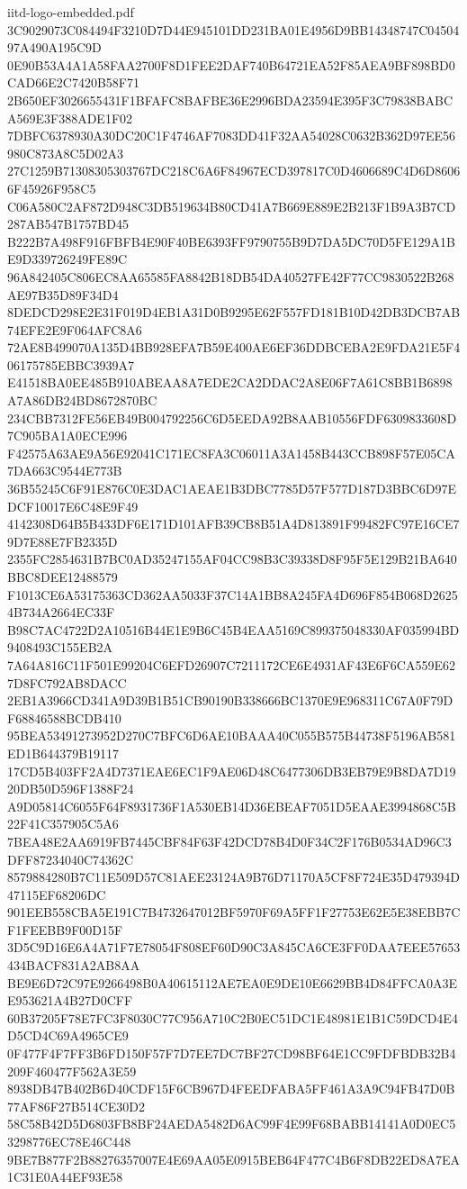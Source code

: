 \begin{filecontents*}[overwrite]{iitd-logo-embedded.pdf}
3C9029073C084494F3210D7D44E945101DD231BA01E4956D9BB14348747C0450497A490A195C9D
0E90B53A4A1A58FAA2700F8D1FEE2DAF740B64721EA52F85AEA9BF898BD0CAD66E2C7420B58F71
2B650EF3026655431F1BFAFC8BAFBE36E2996BDA23594E395F3C79838BABCA569E3F388ADE1F02
7DBFC6378930A30DC20C1F4746AF7083DD41F32AA54028C0632B362D97EE56980C873A8C5D02A3
27C1259B71308305303767DC218C6A6F84967ECD397817C0D4606689C4D6D86066F45926F958C5
C06A580C2AF872D948C3DB519634B80CD41A7B669E889E2B213F1B9A3B7CD287AB547B1757BD45
B222B7A498F916FBFB4E90F40BE6393FF9790755B9D7DA5DC70D5FE129A1BE9D339726249FE89C
96A842405C806EC8AA65585FA8842B18DB54DA40527FE42F77CC9830522B268AE97B35D89F34D4
8DEDCD298E2E31F019D4EB1A31D0B9295E62F557FD181B10D42DB3DCB7AB74EFE2E9F064AFC8A6
72AE8B499070A135D4BB928EFA7B59E400AE6EF36DDBCEBA2E9FDA21E5F406175785EBBC3939A7
E41518BA0EE485B910ABEAA8A7EDE2CA2DDAC2A8E06F7A61C8BB1B6898A7A86DB24BD8672870BC
234CBB7312FE56EB49B004792256C6D5EEDA92B8AAB10556FDF6309833608D7C905BA1A0ECE996
F42575A63AE9A56E92041C171EC8FA3C06011A3A1458B443CCB898F57E05CA7DA663C9544E773B
36B55245C6F91E876C0E3DAC1AEAE1B3DBC7785D57F577D187D3BBC6D97EDCF10017E6C48E9F49
4142308D64B5B433DF6E171D101AFB39CB8B51A4D813891F99482FC97E16CE79D7E88E7FB2335D
2355FC2854631B7BC0AD35247155AF04CC98B3C39338D8F95F5E129B21BA640BBC8DEE12488579
F1013CE6A53175363CD362AA5033F37C14A1BB8A245FA4D696F854B068D26254B734A2664EC33F
B98C7AC4722D2A10516B44E1E9B6C45B4EAA5169C899375048330AF035994BD9408493C155EB2A
7A64A816C11F501E99204C6EFD26907C7211172CE6E4931AF43E6F6CA559E627D8FC792AB8DACC
2EB1A3966CD341A9D39B1B51CB90190B338666BC1370E9E968311C67A0F79DF68846588BCDB410
95BEA53491273952D270C7BFC6D6AE10BAAA40C055B575B44738F5196AB581ED1B644379B19117
17CD5B403FF2A4D7371EAE6EC1F9AE06D48C6477306DB3EB79E9B8DA7D1920DB50D596F1388F24
A9D05814C6055F64F8931736F1A530EB14D36EBEAF7051D5EAAE3994868C5B22F41C357905C5A6
7BEA48E2AA6919FB7445CBF84F63F42DCD78B4D0F34C2F176B0534AD96C3DFF87234040C74362C
8579884280B7C11E509D57C81AEE23124A9B76D71170A5CF8F724E35D479394D47115EF68206DC
901EEB558CBA5E191C7B4732647012BF5970F69A5FF1F27753E62E5E38EBB7CF1FEEBB9F00D15F
3D5C9D16E6A4A71F7E78054F808EF60D90C3A845CA6CE3FF0DAA7EEE57653434BACF831A2AB8AA
BE9E6D72C97E9266498B0A40615112AE7EA0E9DE10E6629BB4D84FFCA0A3EE953621A4B27D0CFF
60B37205F78E7FC3F8030C77C956A710C2B0EC51DC1E48981E1B1C59DCD4E4D5CD4C69A4965CE9
0F477F4F7FF3B6FD150F57F7D7EE7DC7BF27CD98BF64E1CC9FDFBDB32B4209F460477F562A3E59
8938DB47B402B6D40CDF15F6CB967D4FEEDFABA5FF461A3A9C94FB47D0B77AF86F27B514CE30D2
58C58B42D5D6803FB8BF24AEDA5482D6AC99F4E99F68BABB14141A0D0EC53298776EC78E46C448
9BE7B877F2B88276357007E4E69AA05E0915BEB64F477C4B6F8DB22ED8A7EA1C31E0A44EF93E58

\end{filecontents*}
